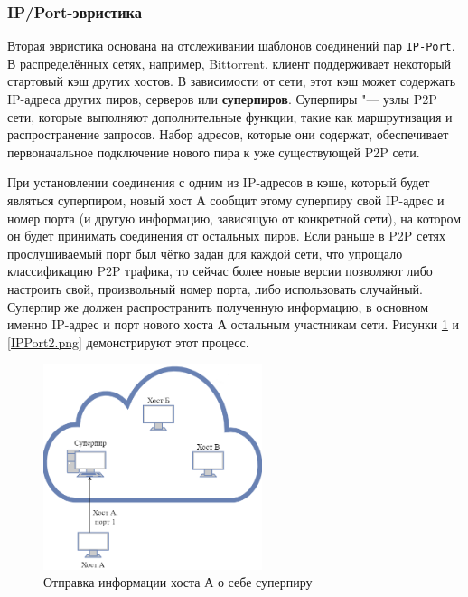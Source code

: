\documentclass[bachelor, och, coursework]{SCWorks}
\begin{document}

\subsubsection{IP/Port-эвристика}
Вторая эвристика основана на отслеживании шаблонов соединений пар \texttt{IP-Port}. В распределённых сетях, например, Bittorrent, клиент поддерживает некоторый стартовый кэш других хостов. В зависимости от сети, этот кэш может содержать IP-адреса других пиров, серверов или \textbf{суперпиров}. Суперпиры "--- узлы P2P сети, которые выполняют дополнительные функции, такие как маршрутизация и распространение запросов. Набор адресов, которые они содержат, обеспечивает первоначальное подключение нового пира к уже существующей P2P сети.

При установлении соединения с одним из IP-адресов в кэше, который будет являться суперпиром, новый хост А сообщит этому суперпиру свой IP-адрес и номер порта (и другую информацию, зависящую от конкретной сети), на котором он будет принимать соединения от остальных пиров. Если раньше в P2P сетях прослушиваемый порт был чётко задан для каждой сети, что упрощало классификацию P2P трафика, то сейчас более новые версии позволяют либо настроить свой, произвольный номер порта, либо использовать случайный. Суперпир же должен распространить полученную информацию, в основном именно IP-адрес и порт нового хоста А остальным участникам сети. Рисунки \ref{IPPort1.png} и \ref{IPPort2.png} демонстрируют этот процесс.
\begin{figure}[H]
    \centering
    \includegraphics[width=0.57\textwidth]{IPPort1.png}
    \caption{Отправка информации хоста А о себе суперпиру}
    \label{IPPort1.png}
\end{figure}
\end{document}
